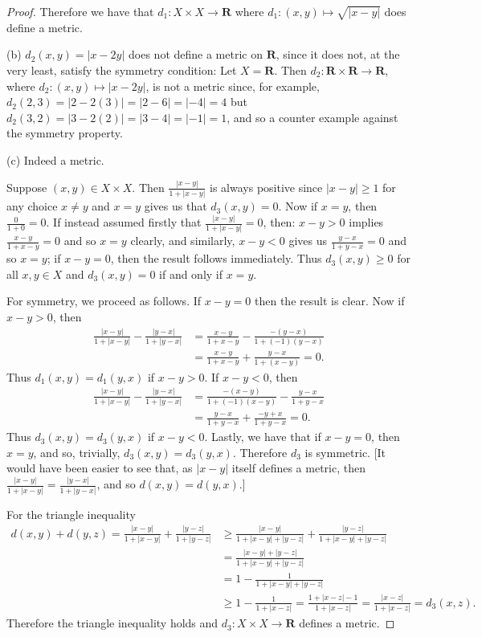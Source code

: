 \documentclass[9pt,reqno]{amsart}
\theoremstyle{definition}
\newcommand{\rr}{\mathbf R}
\begin{document}
\begin{proof}
	 Therefore we have that $d_1 \colon X \times X \to \rr$ where $d_1 \colon (x,y) \mapsto \sqrt{|x-y|}$ does define a metric. 

	(b) $d_2(x,y) = |x-2y|$ does not define a metric on $\rr$, since it does not, at the very least, satisfy the symmetry condition: Let $X = \rr$. Then $d_2 \colon \rr \times \rr \to \rr$, where $d_2 \colon (x,y) \mapsto |x-2y|$, is not a metric since, for example, $d_2(2, 3) = |2-2(3)| = |2-6| = |-4| = 4$ but $d_2(3,2) = |3-2(2)| = |3-4| = |-1| = 1$, and so a counter example against the symmetry property.  
	
	(c) Indeed a metric.
	
	Suppose $(x,y) \in X \times X$. Then $\frac{|x-y|}{1+|x-y|}$ is always positive since $|x-y| \geq 1$ for any choice $x \neq y$ and $x=y$ gives us that $d_3(x,y) = 0$. Now if $x=y$, then $\frac{0}{1+0} = 0$. If instead assumed firstly that $\frac{|x-y|}{1+|x-y|} = 0$, then: $x-y>0$ implies $\frac{x-y}{1+x-y} = 0$ and so $x=y$ clearly, and similarly, $x-y<0$ gives us $\frac{y-x}{1+y-x} = 0 $ and so $x=y$; if $x -y = 0$, then the result follows immediately. Thus $d_3(x,y) \geq 0$ for all $x,y \in X$ and $d_3(x,y) = 0$ if and only if $x =y$.
	
	For symmetry, we proceed as follows. If $x-y = 0$ then the result is clear. Now if $x-y>0$, then 
	\begin{align*}
		\frac{|x-y|}{1+|x-y|} - \frac{|y-x|}{1+|y-x|} &= \frac{x-y}{1+x-y} - \frac{-(y-x)}{1+(-1)(y-x)} \\
		&= \frac{x-y}{1+x-y} + \frac{y-x}{1+(x-y)} = 0.
	\end{align*} Thus $d_1(x,y) = d_1(y,x)$ if $x-y>0$. If $x-y<0$, then
	\begin{align*}
		\frac{|x-y|}{1+|x-y|} - \frac{|y-x|}{1+|y-x|} &= \frac{-(x-y)}{1+(-1)(x-y)} - \frac{y-x}{1+y-x} \\
		&= \frac{y-x}{1+y-x} + \frac{-y+x}{1+y-x} = 0.
	\end{align*} Thus $d_3(x,y) = d_3(y,x)$ if $x-y<0$. Lastly, we have that if $x-y = 0$, then $x=y$, and so, trivially, $d_3(x,y) = d_3(y,x)$. Therefore $d_3$ is symmetric. [It would have been easier to see that, as $|x-y|$ itself defines a metric, then $\frac{|x-y|}{1+|x-y|} = \frac{|y-x|}{1+|y-x|}$, and so $d(x,y) = d(y,x)$.]
	
	For the triangle inequality
	\begin{align*}
		d(x,y) + d(y,z) = \frac{|x-y|}{1+|x-y|} + \frac{|y-z|}{1+|y-z|} &\geq \frac{|x-y|}{1+|x-y|+|y-z|} + \frac{|y-z|}{1+|x-y|+|y-z|} \\ 
		&= \frac{|x-y|+|y-z|}{1+|x-y|+|y-z|}  \\ 
		&= 1-\frac{1}{1+|x-y|+|y-z|} \\
		& \geq 1 - \frac{1}{1+|x-z|} = \frac{1+|x-z|-1}{1+|x-z|} = \frac{|x-z|}{1+|x-z|} = d_3(x,z).
	\end{align*}	
	Therefore the triangle inequality holds and $d_3 \colon X \times X \to \rr$ defines a metric. 
\end{proof}
\end{document}
